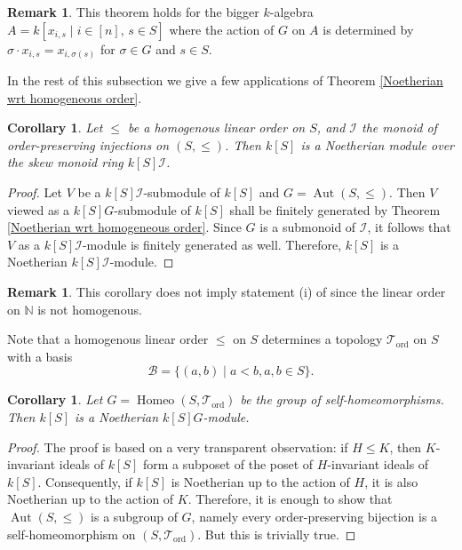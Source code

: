 \documentclass[11pt, reqno]{amsart}
\theoremstyle{plain}
\newtheorem{corollary}[theorem]{Corollary}
\numberwithin{equation}{section}
\theoremstyle{definition}
\newtheorem{remark}[theorem]{Remark}
\DeclareMathOperator{\Aut}{Aut}
\DeclareMathOperator{\Homeo}{Homeo}
\begin{document}
\begin{remark}
This theorem holds for the bigger $k$-algebra $A = k[x_{i,s} \mid i \in [n], \, s \in S]$ where the action of $G$ on $A$ is determined by $\sigma \cdot x_{i, s} = x_{i, \sigma(s)}$ for $\sigma \in G$ and $s \in S$.
\end{remark}


In the rest of this subsection we give a few applications of Theorem \ref{Noetherian wrt homogeneous order}.

\begin{corollary}
Let $\leqslant$ be a homogenous linear order on $S$, and $\mathcal{I}$ the monoid of order-preserving injections on $(S, \leqslant)$. Then $k[S]$ is a Noetherian module over the skew monoid ring $k[S]\mathcal{I}$.
\end{corollary}

\begin{proof}
Let $V$ be a $k[S]\mathcal{I}$-submodule of $k[S]$ and $G = \Aut(S, \leqslant)$. Then $V$ viewed as a $k[S]G$-submodule of $k[S]$ shall be finitely generated by Theorem \ref{Noetherian wrt homogeneous order}. Since $G$ is a submonoid of $\mathcal{I}$, it follows that $V$ as a $k[S] \mathcal{I}$-module is finitely generated as well. Therefore, $k[S]$ is a Noetherian $k[S]\mathcal{I}$-module.
\end{proof}

\begin{remark}
This corollary does not imply statement (i) of \cite[Corollary 6.21]{NR1} since the linear order on $\mathbb{N}$ is not homogenous.
\end{remark}

Note that a homogenous linear order $\leqslant$ on $S$ determines a topology $\mathcal{T}_{\mathrm{ord}}$ on $S$ with a basis
\[
\mathcal{B} = \{ (a, b) \mid a < b, a, b \in S \}.
\]

\begin{corollary}
Let $G = \Homeo(S, \mathcal{T}_{\mathrm{ord}})$ be the group of self-homeomorphisms. Then $k[S]$ is a Noetherian $k[S]G$-module.
\end{corollary}

\begin{proof}
The proof is based on a very transparent observation: if $H \leqslant K$, then $K$-invariant ideals of $k[S]$ form a subposet of the poset of $H$-invariant ideals of $k[S]$. Consequently, if $k[S]$ is Noetherian up to the action of $H$, it is also Noetherian up to the action of $K$. Therefore, it is enough to show that $\Aut(S, \leqslant)$ is a subgroup of $G$, namely every order-preserving bijection is a self-homeomorphism on $(S, \mathcal{T}_{\mathrm{ord}})$. But this is trivially true.
\end{proof}
\end{document}
